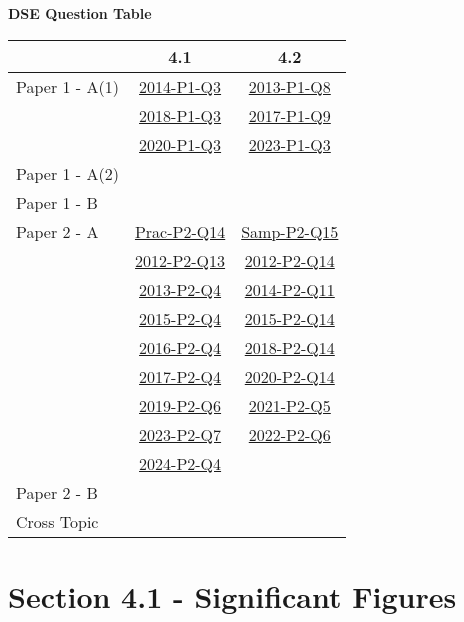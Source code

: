 \documentclass[12pt, a4paper]{article}
\begin{document}
\begin{absolutelynopagebreak}
\begin{center}
\textbf{DSE Question Table}
\end{center}
\begin{center}
\begin{tabular}{|l|c|c|}
\hline
        & 4.1 & 4.2 \\\hline
\hline
Paper 1 - A(1)& \hyperref[DSE2014-CoreP1-Q03]{2014-P1-Q3} & \hyperref[DSE2013-CoreP1-Q08]{2013-P1-Q8} \\
& \hyperref[DSE2018-CoreP1-Q03]{2018-P1-Q3} & \hyperref[DSE2017-CoreP1-Q09]{2017-P1-Q9} \\
& \hyperref[DSE2020-CoreP1-Q03]{2020-P1-Q3} & \hyperref[DSE2023-CoreP1-Q03]{2023-P1-Q3} \\
\hline
Paper 1 - A(2)&  &  \\
\hline
Paper 1 - B&  &  \\
\hline
\hline
Paper 2 - A& \hyperref[DSE2012P-CoreP2-Q14]{Prac-P2-Q14} & \hyperref[DSE2012S-CoreP2-Q15]{Samp-P2-Q15} \\
& \hyperref[DSE2012-CoreP2-Q13]{2012-P2-Q13} & \hyperref[DSE2012-CoreP2-Q14]{2012-P2-Q14} \\
& \hyperref[DSE2013-CoreP2-Q04]{2013-P2-Q4} & \hyperref[DSE2014-CoreP2-Q11]{2014-P2-Q11} \\
& \hyperref[DSE2015-CoreP2-Q04]{2015-P2-Q4} & \hyperref[DSE2015-CoreP2-Q14]{2015-P2-Q14} \\
& \hyperref[DSE2016-CoreP2-Q04]{2016-P2-Q4} & \hyperref[DSE2018-CoreP2-Q14]{2018-P2-Q14} \\
& \hyperref[DSE2017-CoreP2-Q04]{2017-P2-Q4} & \hyperref[DSE2020-CoreP2-Q14]{2020-P2-Q14} \\
& \hyperref[DSE2019-CoreP2-Q06]{2019-P2-Q6} & \hyperref[DSE2021-CoreP2-Q05]{2021-P2-Q5} \\
& \hyperref[DSE2023-CoreP2-Q07]{2023-P2-Q7} & \hyperref[DSE2022-CoreP2-Q06]{2022-P2-Q6} \\
& \hyperref[DSE2024-CoreP2-Q04]{2024-P2-Q4} &  \\
\hline
Paper 2 - B&  &  \\
\hline
\hline
Cross Topic&  &  \\
\hline
\end{tabular}
\end{center}
\end{absolutelynopagebreak}




\section*{Section 4.1 - Significant Figures}\label{section:2-4-1}
\end{document}
